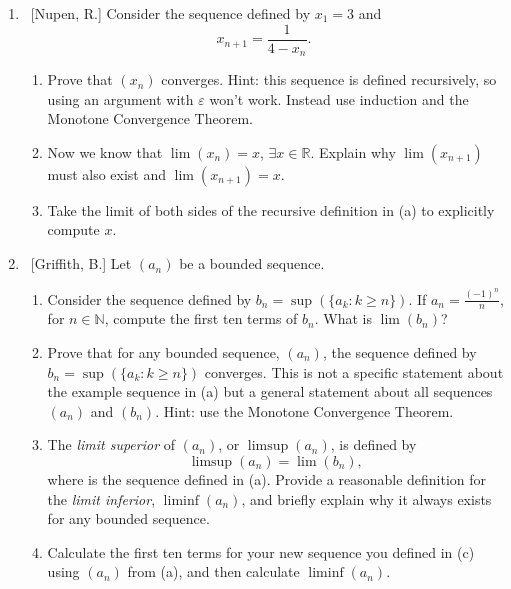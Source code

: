 \documentclass[10pt]{article}
\theoremstyle{definition}
\begin{document}
\begin{enumerate}


\item  ~[Nupen, R.] Consider the sequence defined by $x_1 = 3$ and $$x_{n+1} = \frac{1}{4-x_n}.$$

	\begin{enumerate}
	
	\item  Prove that $(x_n)$ converges.  Hint: this sequence is defined recursively, so using an argument with $\varepsilon$ won't work.  Instead use induction and the Monotone Convergence Theorem.
	
	\item  Now we know that $\lim{(x_n)} = x$, $\exists x \in \mathbb{R}$.  Explain why $\lim{(x_{n+1})}$ must also exist and $\lim{(x_{n+1})} = x$.
	
	\item  Take the limit of both sides of the recursive definition in (a) to explicitly compute $x$.
	
	\end{enumerate}
	

\item  ~[Griffith, B.] Let $(a_n)$ be a bounded sequence.

	\begin{enumerate}
	
	\item  Consider the sequence defined by $b_n = \sup{\left(\{ a_k : k \geq n \} \right)}$.  If $a_n = \frac{(-1)^n}{n}$, for $n \in \mathbb{N}$, compute the first ten terms of $b_n$.  What is $\lim{(b_n)}$?
	
	\item  Prove that for any bounded sequence, $(a_n)$, the sequence defined by $b_n = \sup{\left(\{ a_k : k \geq n \} \right)}$ converges.  This is not a specific statement about the example sequence in (a) but a general statement about all sequences $(a_n)$ and $(b_n)$.  Hint: use the Monotone Convergence Theorem.
	
	\item  The \emph{limit superior} of $(a_n)$, or $\limsup{(a_n)}$, is defined by $$\limsup{(a_n)} = \lim{(b_n)},$$ where is the sequence defined in (a).  Provide a reasonable definition for the \emph{limit inferior}, $\liminf{(a_n)}$, and briefly explain why it always exists for any bounded sequence.
	
	\item  Calculate the first ten terms for your new sequence you defined in (c) using $(a_n)$ from (a), and then calculate $\liminf{(a_n)}$.
	

\end{enumerate}
\end{enumerate}
\end{document}
